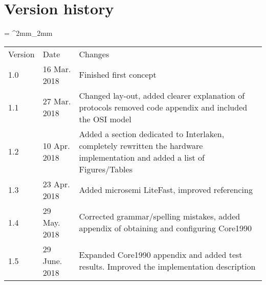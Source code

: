 \section*{Version history}


\newcommand{\tableHeaderStyle}{
	\rowfont{\leavevmode\color{white}\bfseries}
	\rowcolor{tableHeader}
}
\tabulinesep = ^2mm_2mm
\everyrow{\tabucline[.3mm  white]{}}

\begin{table}[h]
	\begin{tabu} to \textwidth {X[0.7] X[1] X[4]}  %
		\tableHeaderStyle
		Version & Date		   & Changes \\ 
		1.0 	& 16 Mar. 2018 & Finished first concept\\ 
		1.1 	& 27 Mar. 2018 & Changed lay-out, added clearer explanation of protocols removed code appendix and included the OSI model\\
		1.2 	& 10 Apr. 2018 & Added a section dedicated to Interlaken, completely rewritten the hardware implementation and added a list of Figures/Tables\\
		1.3		& 23 Apr. 2018 & Added microsemi LiteFast, improved referencing \\
		1.4		& 29 May. 2018 & Corrected grammar/spelling mistakes, added appendix of obtaining and configuring Core1990 \\
		1.5		& 29 June. 2018 & Expanded Core1990 appendix and added test results. Improved the implementation description 
	\end{tabu}
\end{table}

\newpage

\tableofcontents
\newpage

\listoffigures

\listoftables
\newpage

\printnoidxglossary[type=acronym, title = Abbreviations]
\newpage

\graphicspath{{./Images/}}